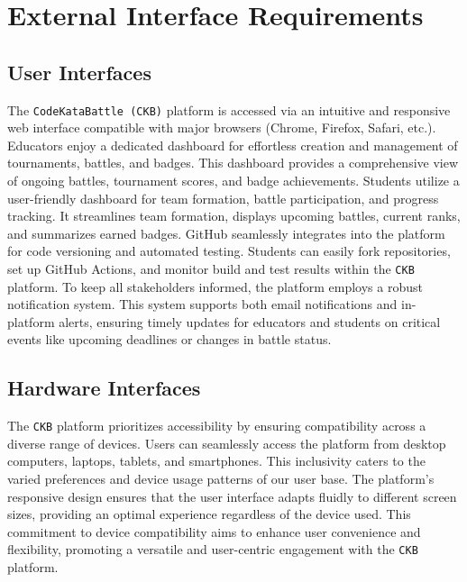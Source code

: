 \section{External Interface Requirements}
\label{sec:external_interface_requirements}%

\subsection{User Interfaces}
\label{subsec:user_interfaces}%
The \verb|CodeKataBattle (CKB)| platform is accessed via an intuitive and responsive web interface compatible with major browsers (Chrome, Firefox, Safari, etc.).
Educators enjoy a dedicated dashboard for effortless creation and management of tournaments, battles, and badges. This dashboard provides a comprehensive view of ongoing battles, tournament scores, and badge achievements.
Students utilize a user-friendly dashboard for team formation, battle participation, and progress tracking. It streamlines team formation, displays upcoming battles, current ranks, and summarizes earned badges.
GitHub seamlessly integrates into the platform for code versioning and automated testing. Students can easily fork repositories, set up GitHub Actions, and monitor build and test results within the \verb|CKB| platform.
To keep all stakeholders informed, the platform employs a robust notification system. This system supports both email notifications and in-platform alerts, 
ensuring timely updates for educators and students on critical events like upcoming deadlines or changes in battle status.

\subsection{Hardware Interfaces}
\label{subsec:hardware_interfaces}%
The \verb|CKB| platform prioritizes accessibility by ensuring compatibility across a diverse range of devices. 
Users can seamlessly access the platform from desktop computers, laptops, tablets, and smartphones. This inclusivity caters to the varied preferences and device usage patterns of our user base. 
The platform's responsive design ensures that the user interface adapts fluidly to different screen sizes, providing an optimal experience regardless of the device used. 
This commitment to device compatibility aims to enhance user convenience and flexibility, promoting a versatile and user-centric engagement with the \verb|CKB| platform.

